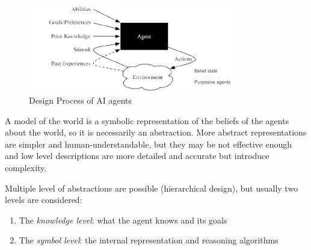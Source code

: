 \begin{figure}
    \includegraphics[width=0.8\textwidth]{Images/agents}
    \caption{Design Process of AI agents}
    \label{img:designProcess}
\end{figure}
A model of the world is a symbolic representation of the beliefs of the agents about the world, 
so it is necessarily an abstraction.\newline
More abstract representations are simpler and human-understandable, but they
may be not effective enough and low level descriptions are more detailed and accurate but introduce complexity.

Multiple level of abstractions are possible (hierarchical design), but usually two levels are considered:
\begin{enumerate}
    \item The \emph{knowledge level}: what the agent knows and its goals
    \item The \emph{symbol level}: the internal representation and reasoning algorithms
\end{enumerate}

